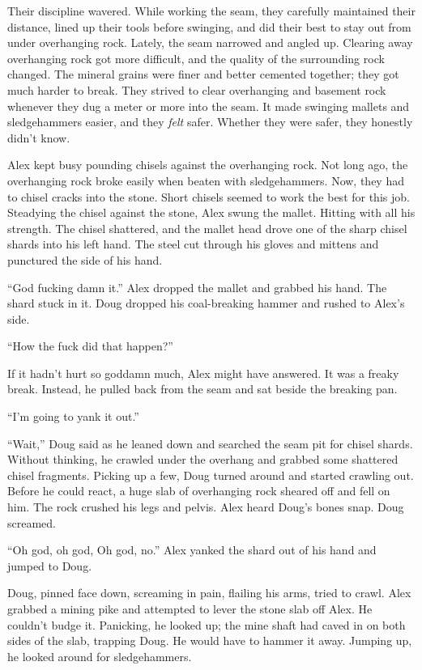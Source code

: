 Their discipline wavered. While working the seam, they carefully
maintained their distance, lined up their tools before swinging, and did
their best to stay out from under overhanging rock. Lately, the seam
narrowed and angled up. Clearing away overhanging rock got more
difficult, and the quality of the surrounding rock changed. The mineral
grains were finer and better cemented together; they got much harder to
break. They strived to clear overhanging and basement rock whenever they
dug a meter or more into the seam. It made swinging mallets and
sledgehammers easier, and they \emph{felt} safer. Whether they were
safer, they honestly didn't know.

Alex kept busy pounding chisels against the overhanging rock. Not long
ago, the overhanging rock broke easily when beaten with sledgehammers.
Now, they had to chisel cracks into the stone. Short chisels seemed to
work the best for this job. Steadying the chisel against the stone, Alex
swung the mallet. Hitting with all his strength. The chisel shattered,
and the mallet head drove one of the sharp chisel shards into his left
hand. The steel cut through his gloves and mittens and punctured the
side of his hand.

``God fucking damn it.'' Alex dropped the mallet and grabbed his hand.
The shard stuck in it. Doug dropped his coal-breaking hammer and rushed
to Alex's side.

``How the fuck did that happen?''

If it hadn't hurt so goddamn much, Alex might have answered. It was a
freaky break. Instead, he pulled back from the seam and sat beside the
breaking pan.

``I'm going to yank it out.''

``Wait,'' Doug said as he leaned down and searched the seam pit for
chisel shards. Without thinking, he crawled under the overhang and
grabbed some shattered chisel fragments. Picking up a few, Doug turned
around and started crawling out. Before he could react, a huge slab of
overhanging rock sheared off and fell on him. The rock crushed his legs
and pelvis. Alex heard Doug's bones snap. Doug screamed.

``Oh god, oh god, Oh god, no.'' Alex yanked the shard out of his hand
and jumped to Doug.

Doug, pinned face down, screaming in pain, flailing his arms, tried to
crawl. Alex grabbed a mining pike and attempted to lever the stone slab
off Alex. He couldn't budge it. Panicking, he looked up; the mine shaft
had caved in on both sides of the slab, trapping Doug. He would have to
hammer it away. Jumping up, he looked around for sledgehammers.

